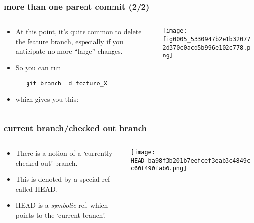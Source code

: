 \documentclass[presentation]{beamer}
\begin{document}
\begin{frame}[fragile]
\frametitle{more than one parent commit (2/2)}
\label{sec-3-4}
\begin{columns}
\begin{column}{0.6\textwidth}
\label{sec-3-4-1}

\begin{itemize}
\item At this point, it's quite common to delete the feature branch, especially if
  you anticipate no more ``large'' changes.
\item So you can run 

\begin{verbatim}
   git branch -d feature_X
\end{verbatim}
\item which gives you this:
\end{itemize}
\end{column}
\begin{column}{0.4\textwidth}
\label{sec-3-4-2}




\texttt{[image: fig0005\_5330947b2e1b320772d370c0acd5b996e102c778.png]}
\end{column}
\end{columns}
\end{frame}
\begin{frame}
\frametitle{current branch/checked out branch}
\label{sec-3-5}
\begin{columns}
\begin{column}{0.6\textwidth}
\label{sec-3-5-1}

\begin{itemize}
\item There is a notion of a `currently checked out' branch.
\item This is denoted by a
  special ref called HEAD.
\item HEAD is a \emph{symbolic} ref, which points to the
  `current branch'.
\end{itemize}
\end{column}
\begin{column}{0.4\textwidth}
\label{sec-3-5-2}





\texttt{[image: HEAD\_ba98f3b201b7eefcef3eab3c4849cc60f490fab0.png]}
\end{column}
\end{columns}
\end{frame}
\end{document}

